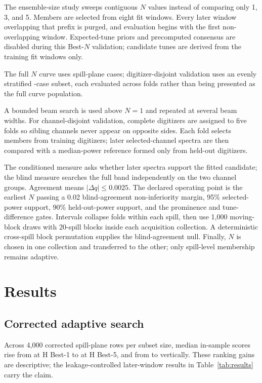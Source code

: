 \documentclass[]{jacow}
\begin{document}
The ensemble-size study sweeps contiguous $N$ values instead of comparing only 1, 3, and 5. Members are selected from eight fit windows. Every later window overlapping that prefix is purged, and evaluation begins with the first non-overlapping window. Expected-tune priors and precomputed consensus are disabled during this Best-$N$ validation; candidate tunes are derived from the training fit windows only.

The full $N$ curve uses \BestNCurveSpillPlaneCount{} spill-plane cases; digitizer-disjoint validation uses an evenly stratified \BestNValidationSpillPlaneCount{}-case subset, each evaluated across \BestNDigitizerFoldCount{} folds rather than being presented as the full curve population.

A bounded beam search is used above $N=1$ and repeated at several beam widths. For channel-disjoint validation, complete digitizers are assigned to five folds so sibling channels never appear on opposite sides. Each fold selects members from training digitizers; later selected-channel spectra are then compared with a median-power reference formed only from held-out digitizers.

The conditioned measure asks whether later spectra support the fitted candidate; the blind measure searches the full band independently on the two channel groups. Agreement means $|\Delta q|\leq0.0025$. The declared operating point is the earliest $N$ passing a 0.02 blind-agreement non-inferiority margin, 95\% selected-power support, 90\% held-out-power support, and the prominence and tune-difference gates. Intervals collapse folds within each spill, then use 1,000 moving-block draws with 20-spill blocks inside each acquisition collection. A deterministic cross-spill block permutation supplies the blind-agreement null. Finally, $N$ is chosen in one collection and transferred to the other; only spill-level membership remains adaptive.

\section{Results}

\subsection{Corrected adaptive search}

Across 4,000 corrected spill-plane rows per subset size, median in-sample scores rise from \PrimaryHBestOneScore{} at H Best-1 to \PrimaryHBestFiveScore{} at H Best-5, and from \PrimaryVBestOneScore{} to \PrimaryVBestFiveScore{} vertically. These ranking gains are descriptive; the leakage-controlled later-window results in Table~\ref{tab:results} carry the claim.
\end{document}
